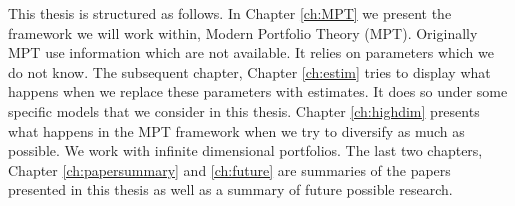 This thesis is structured as follows. 
In Chapter \ref{ch:MPT} we present the framework we will work within, \citet{markowitz1959portfolio} Modern Portfolio Theory (MPT). 
Originally MPT use information which are not available. 
It relies on parameters which we do not know. 
The subsequent chapter, Chapter \ref{ch:estim} tries to display what happens when we replace these parameters with estimates.
It does so under some specific models that we consider in this thesis.
Chapter \ref{ch:highdim} presents what happens in the MPT framework when we try to diversify as much as possible.
We work with infinite dimensional portfolios.
The last two chapters, Chapter \ref{ch:papersummary} and \ref{ch:future} are summaries of the papers presented in this thesis as well as a summary of future possible research.

